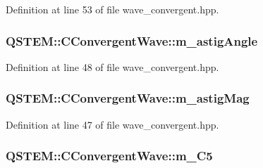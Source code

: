 Definition at line 53 of file wave\-\_\-convergent.\-hpp.

\hypertarget{class_q_s_t_e_m_1_1_c_convergent_wave_a2c500b78bf0bb4a0b8e76f5af6ebf844}{
\subsubsection[{m\-\_\-astig\-Angle}]{ Q\-S\-T\-E\-M\-::\-C\-Convergent\-Wave\-::m\-\_\-astig\-Angle\hspace{0.3cm}{\ttfamily [protected]}}}\label{class_q_s_t_e_m_1_1_c_convergent_wave_a2c500b78bf0bb4a0b8e76f5af6ebf844}


Definition at line 48 of file wave\-\_\-convergent.\-hpp.

\hypertarget{class_q_s_t_e_m_1_1_c_convergent_wave_aece4e3f18fe29745740ef6a732027acb}{
\subsubsection[{m\-\_\-astig\-Mag}]{ Q\-S\-T\-E\-M\-::\-C\-Convergent\-Wave\-::m\-\_\-astig\-Mag\hspace{0.3cm}{\ttfamily [protected]}}}\label{class_q_s_t_e_m_1_1_c_convergent_wave_aece4e3f18fe29745740ef6a732027acb}


Definition at line 47 of file wave\-\_\-convergent.\-hpp.

\hypertarget{class_q_s_t_e_m_1_1_c_convergent_wave_ad71f4b3536a958be3e948e2b8835ebdb}{
\subsubsection[{m\-\_\-\-C5}]{ Q\-S\-T\-E\-M\-::\-C\-Convergent\-Wave\-::m\-\_\-\-C5\hspace{0.3cm}{\ttfamily [protected]}}}\label{class_q_s_t_e_m_1_1_c_convergent_wave_ad71f4b3536a958be3e948e2b8835ebdb}


